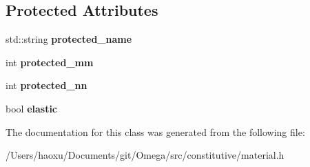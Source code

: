 \subsection*{Protected Attributes}
\begin{DoxyCompactItemize}
\item 
\mbox{\label{classmaterial_ac21199a1ff299d5659537582d142cd86}} 
std\+::string {\bfseries protected\+\_\+name}
\item 
\mbox{\label{classmaterial_aa14a53f5518bea9c49c4533e5116a060}} 
int {\bfseries protected\+\_\+mm}
\item 
\mbox{\label{classmaterial_acb00d1524c7c24f9d3ed0be9f81053d6}} 
int {\bfseries protected\+\_\+nn}
\item 
\mbox{\label{classmaterial_a9476163cbfc6a24de796b1ac5934c4c8}} 
bool {\bfseries elastic}
\end{DoxyCompactItemize}


The documentation for this class was generated from the following file\+:\begin{DoxyCompactItemize}
\item 
/\+Users/haoxu/\+Documents/git/\+Omega/src/constitutive/material.\+h\end{DoxyCompactItemize}
